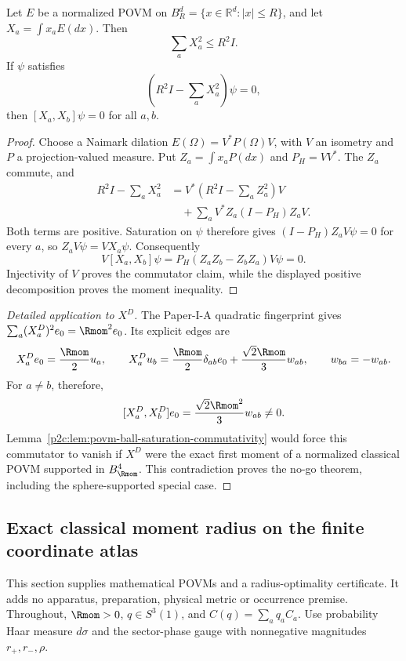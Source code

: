 \documentclass[11pt,a4paper]{article}
\begin{document}
\begin{lemma}
\label{p2c:lem:povm-ball-saturation-commutativity}
Let \(E\) be a normalized POVM on
\(B_R^d=\{x\in\mathbb R^d:|x|\le R\}\), and let
\(X_a=\int x_aE(dx)\).  Then
\[
 \sum_aX_a^2\le R^2I.
\]
If \(\psi\) satisfies
\[
 \left(R^2I-\sum_aX_a^2\right)\psi=0,
\]
then \([X_a,X_b]\psi=0\) for all \(a,b\).
\end{lemma}

\begin{proof}
Choose a Naimark dilation \(E(\Omega)=V^*P(\Omega)V\), with \(V\) an
isometry and \(P\) a projection-valued measure.  Put
\(Z_a=\int x_aP(dx)\) and \(P_H=VV^*\).  The \(Z_a\) commute, and
\[
 \begin{aligned}
 R^2I-\sum_aX_a^2
 &=V^*\left(R^2I-\sum_aZ_a^2\right)V\\
 &\quad+\sum_aV^*Z_a(I-P_H)Z_aV.
 \end{aligned}
\]
Both terms are positive.  Saturation on \(\psi\) therefore gives
\((I-P_H)Z_aV\psi=0\) for every \(a\), so
\(Z_aV\psi=VX_a\psi\).  Consequently
\[
 V[X_a,X_b]\psi
 =P_H(Z_aZ_b-Z_bZ_a)V\psi=0.
\]
Injectivity of \(V\) proves the commutator claim, while the displayed positive
decomposition proves the moment inequality.
\end{proof}

\begin{proof}[Detailed application to \(X^D\)]
The Paper-I-A quadratic fingerprint gives
\(\sum_a(X_a^D)^2e_0=\Rmom^2e_0\).  Its explicit edges are
\[
 X_a^De_0=\frac{\Rmom}{2}u_a,
 \qquad
 X_a^Du_b=\frac{\Rmom}{2}\delta_{ab}e_0
 +\frac{\sqrt2\Rmom}{3}w_{ab},
 \qquad w_{ba}=-w_{ab}.
\]
For \(a\ne b\), therefore,
\[
 [X_a^D,X_b^D]e_0
 =\frac{\sqrt2\Rmom^2}{3}w_{ab}\ne0.
\]
Lemma~\ref{p2c:lem:povm-ball-saturation-commutativity} would force this
commutator to vanish if \(X^D\) were the exact first moment of a normalized
classical POVM supported in \(B_{\Rmom}^4\).  This contradiction proves the
no-go theorem, including the sphere-supported special case.
\end{proof}

\subsection{Exact classical moment radius on the finite coordinate atlas}
\label{p2c:app:optimal-classical-moment-radius}
This section supplies mathematical POVMs and a radius-optimality certificate.
It adds no apparatus, preparation, physical metric or occurrence premise.
Throughout, $\Rmom>0$, $q\in S^3(1)$, and $C(q)=\sum_aq_aC_a$.
Use probability Haar measure $d\sigma$ and the sector-phase gauge
with nonnegative magnitudes $r_+,r_-,\rho$.
\end{document}
